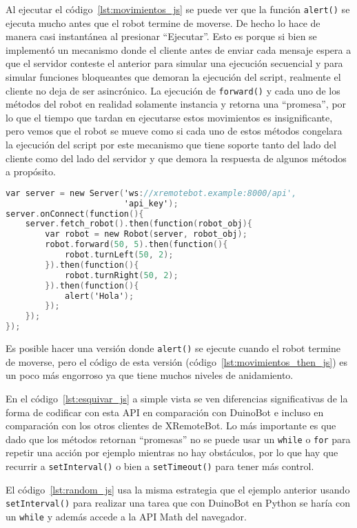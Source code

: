 Al ejecutar el código~\ref{lst:movimientos_js} se puede ver que la
función \texttt{alert()} se ejecuta mucho antes que el
robot termine de moverse. De hecho lo hace de manera casi instantánea
al presionar ``Ejecutar''. Esto es porque
si bien se implementó un mecanismo donde el cliente
antes de enviar cada mensaje espera a que el servidor conteste el
anterior para simular una ejecución secuencial y para simular
funciones bloqueantes que demoran la ejecución del script, realmente
el cliente no deja de ser asincrónico.
La ejecución de \texttt{forward()} y cada uno de los
métodos del robot en realidad solamente instancia y retorna una
``promesa'', por lo que el tiempo que tardan en ejecutarse
estos movimientos es insignificante, pero vemos que el robot
se mueve como si cada uno de estos métodos congelara la ejecución
del script por este mecanismo que tiene soporte tanto del lado
del cliente como del lado del servidor y que demora la respuesta
de algunos métodos a propósito.

\begin{lstlisting}[language=C,
caption={Secuencia de movimientos usando \texttt{Promise\#then()}},
label=lst:movimientos_then_js]
var server = new Server('ws://xremotebot.example:8000/api',
                        'api_key');
server.onConnect(function(){
    server.fetch_robot().then(function(robot_obj){
        var robot = new Robot(server, robot_obj);
        robot.forward(50, 5).then(function(){
            robot.turnLeft(50, 2);
        }).then(function(){
            robot.turnRight(50, 2);
        }).then(function(){
            alert('Hola');
        });
    });
});
\end{lstlisting}

Es posible hacer una versión donde \texttt{alert()} se ejecute cuando
el robot termine de moverse, pero el código de esta versión
(código~\ref{lst:movimientos_then_js}) es
un poco más engorroso ya que tiene muchos niveles de anidamiento.

En el código~\ref{lst:esquivar_js} a simple vista se ven diferencias
significativas de la forma de codificar con esta API en comparación
con DuinoBot e incluso en comparación con los otros clientes de
XRemoteBot. Lo más importante es que dado que los métodos retornan
``promesas'' no se puede usar un \texttt{while} o \texttt{for} para
repetir una acción por ejemplo mientras no hay obstáculos, por lo que
hay que recurrir a \texttt{setInterval()} o bien a \texttt{setTimeout()}
para tener más control.

El código~\ref{lst:random_js} usa la misma estrategia que el ejemplo
anterior usando \texttt{setInterval()} para realizar una tarea
que con DuinoBot en Python se haría con un \texttt{while} y además
accede a la API Math del navegador.

